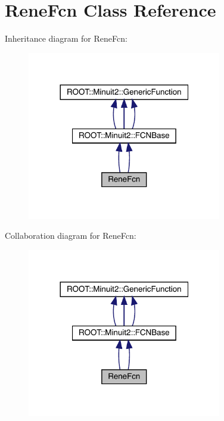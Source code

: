 \hypertarget{classReneFcn}{}\section{Rene\+Fcn Class Reference}
\label{classReneFcn}


Inheritance diagram for Rene\+Fcn\+:
\nopagebreak
\begin{figure}[H]
\begin{center}
\leavevmode
\includegraphics[width=240pt]{db/db4/classReneFcn__inherit__graph}
\end{center}
\end{figure}


Collaboration diagram for Rene\+Fcn\+:
\nopagebreak
\begin{figure}[H]
\begin{center}
\leavevmode
\includegraphics[width=240pt]{d5/d76/classReneFcn__coll__graph}
\end{center}
\end{figure}
